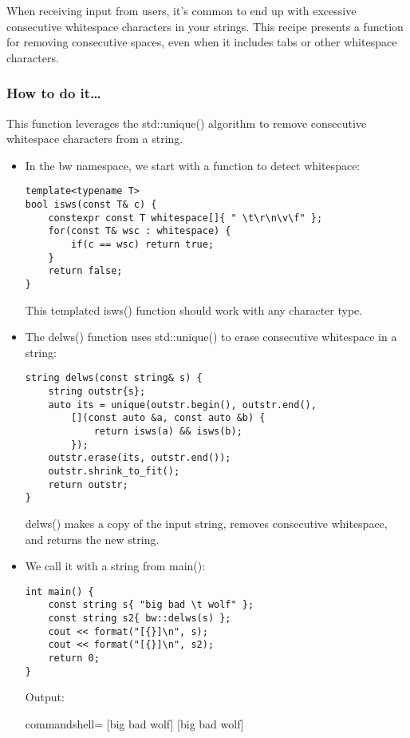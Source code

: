

When receiving input from users, it's common to end up with excessive consecutive whitespace characters in your strings. This recipe presents a function for removing consecutive spaces, even when it includes tabs or other whitespace characters.

\subsubsection{How to do it…}

This function leverages the std::unique() algorithm to remove consecutive whitespace characters from a string.

\begin{itemize}
\item 
In the bw namespace, we start with a function to detect whitespace:

\begin{lstlisting}[style=styleCXX]
template<typename T>
bool isws(const T& c) {
	constexpr const T whitespace[]{ " \t\r\n\v\f" };
	for(const T& wsc : whitespace) {
		if(c == wsc) return true;
	}
	return false;
}
\end{lstlisting}

This templated isws() function should work with any character type.

\item 
The delws() function uses std::unique() to erase consecutive whitespace in a string:

\begin{lstlisting}[style=styleCXX]
string delws(const string& s) {
	string outstr{s};
	auto its = unique(outstr.begin(), outstr.end(),
		[](const auto &a, const auto &b) {
			return isws(a) && isws(b);
		});
	outstr.erase(its, outstr.end());
	outstr.shrink_to_fit();
	return outstr;
}
\end{lstlisting}

delws() makes a copy of the input string, removes consecutive whitespace, and returns the new string.

\item 
We call it with a string from main():

\begin{lstlisting}[style=styleCXX]
int main() {
	const string s{ "big bad \t wolf" };
	const string s2{ bw::delws(s) };
	cout << format("[{}]\n", s);
	cout << format("[{}]\n", s2);
	return 0;
}
\end{lstlisting}

Output:

\begin{tcblisting}{commandshell={}}
[big     bad                  wolf]
[big bad wolf]
\end{tcblisting}

\end{itemize}


